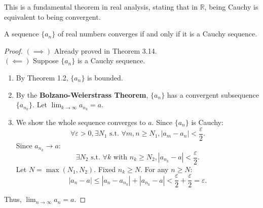 \documentclass[
	UTF-8,
	11pt, %
	a4paper, %
]{LegrandOrangeBook}
\begin{document}
    This is a fundamental theorem in real analysis, stating that in $\mathbb{R}$, being Cauchy is equivalent to being convergent.

    \begin{theorem}
    A sequence $\{a_n\}$ of real numbers converges if and only if it is a Cauchy sequence.
    \end{theorem}

    \begin{proof}
    $(\implies)$ Already proved in Theorem 3.14.\\

    $(\impliedby)$ Suppose $\{a_n\}$ is a Cauchy sequence.
    \begin{enumerate}
        \item By Theorem 1.2, $\{a_n\}$ is bounded.
        \item By the \textbf{Bolzano-Weierstrass Theorem}, $\{a_n\}$ has a convergent subsequence $\{a_{n_k}\}$. Let $\lim_{k \to \infty} a_{n_k} = a$.
        \item We show the whole sequence converges to $a$.
        Since $\{a_n\}$ is Cauchy:
        \[ \forall \varepsilon > 0, \exists N_1 \text{ s.t. } \forall m, n \ge N_1, |a_m - a_n| < \frac{\varepsilon}{2}. \]
        Since $a_{n_k} \to a$:
        \[ \exists N_2 \text{ s.t. } \forall k \text{ with } n_k \ge N_2, |a_{n_k} - a| < \frac{\varepsilon}{2}. \]
        Let $N = \max(N_1, N_2)$. Fixed $n_k \ge N$. For any $n \ge N$:
        \[ |a_n - a| \le |a_n - a_{n_k}| + |a_{n_k} - a| < \frac{\varepsilon}{2} + \frac{\varepsilon}{2} = \varepsilon. \]
    \end{enumerate}
    Thus, $\lim_{n \to \infty} a_n = a$.
    \end{proof}

    \newpage
\end{document}

